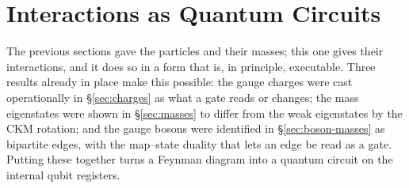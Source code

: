 %

\section{Interactions as Quantum Circuits}
\label{sec:interactions}

The previous sections gave the particles and their masses; this one gives their interactions, and it
does so in a form that is, in principle, executable. Three results already in place make this
possible: the gauge charges were cast operationally in \S\ref{sec:charges} as what a gate reads or
changes; the mass eigenstates were shown in \S\ref{sec:masses} to differ from the weak eigenstates by
the CKM rotation; and the gauge bosons were identified in \S\ref{sec:boson-masses} as bipartite
edges, with the map--state duality that lets an edge be read as a gate. Putting these together turns
a Feynman diagram into a quantum circuit on the internal qubit registers.

